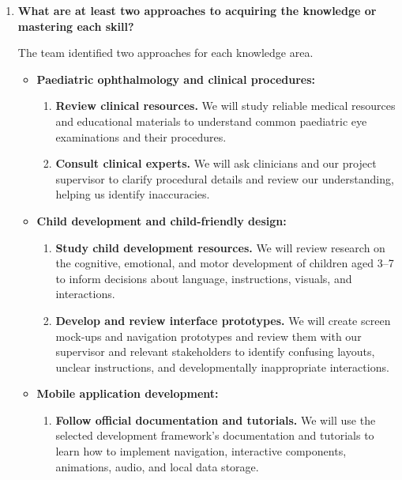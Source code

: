 \documentclass[12pt]{article}
\begin{document}
\begin{enumerate}
    \item \textbf{What are at least two approaches to acquiring the
    knowledge or mastering each skill?}

    The team identified two approaches for each knowledge area.

    \begin{itemize}
        \item \textbf{Paediatric ophthalmology and clinical procedures:}
        \begin{enumerate}
            \item \textbf{Review clinical resources.}
            We will study reliable medical resources and educational
            materials to understand common paediatric eye examinations
            and their procedures.

            \item \textbf{Consult clinical experts.}
            We will ask clinicians and our project supervisor to clarify
            procedural details and review our understanding, helping
            us identify inaccuracies.
        \end{enumerate}

        \item \textbf{Child development and child-friendly design:}
        \begin{enumerate}
            \item \textbf{Study child development resources.}
            We will review research on the cognitive, emotional, and
            motor development of children aged 3--7 to inform decisions
            about language, instructions, visuals, and interactions.

            \item \textbf{Develop and review interface prototypes.}
            We will create screen mock-ups and navigation prototypes
            and review them with our supervisor and relevant stakeholders
            to identify confusing layouts, unclear instructions, and
            developmentally inappropriate interactions.
        \end{enumerate}

        \item \textbf{Mobile application development:}
        \begin{enumerate}
            \item \textbf{Follow official documentation and tutorials.}
            We will use the selected development framework's documentation
            and tutorials to learn how to implement navigation,
            interactive components, animations, audio, and local
            data storage.


\end{enumerate}
\end{itemize}
\end{enumerate}
\end{document}
